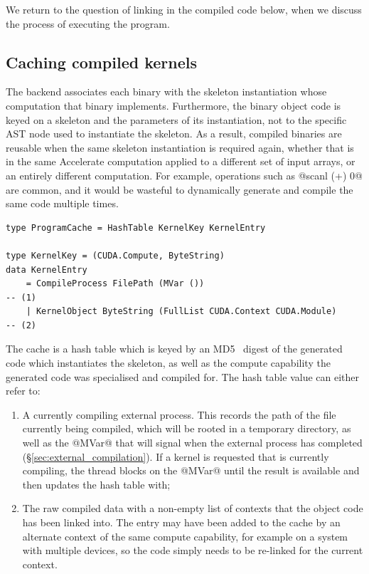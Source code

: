 We return to the question of linking in the compiled code below, when we discuss
the process of executing the program.


\subsection{Caching compiled kernels}
\label{sec:caching_compiled_kernels}

The \CUDA backend associates each \CUDA binary with the skeleton instantiation
whose computation that binary implements. Furthermore, the binary object code is
keyed on a skeleton and the parameters of its instantiation, not to the specific
AST node used to instantiate the skeleton. As a result, compiled binaries are
reusable when the same skeleton instantiation is required again, whether that is
in the same Accelerate computation applied to a different set of input arrays,
or an entirely different computation. For example, operations such as
@scanl (+) 0@ are common, and it would be wasteful to dynamically generate
and compile the same code multiple times.

\begin{lstlisting}[style=haskell,numbers=none]
type ProgramCache = HashTable KernelKey KernelEntry

type KernelKey = (CUDA.Compute, ByteString)
data KernelEntry
    = CompileProcess FilePath (MVar ())                                 -- (1)
    | KernelObject ByteString (FullList CUDA.Context CUDA.Module)       -- (2)
\end{lstlisting}

The cache is a hash table which is keyed by an MD5~\cite{Rivest:1992va} digest
of the generated \CUDA code which instantiates the skeleton, as well as the
compute capability the generated code was specialised and compiled for. The hash
table value can either refer to:
%
\begin{enumerate}
\item A currently compiling external process. This records the path of the file
    currently being compiled, which will be rooted in a temporary directory, as
    well as the @MVar@ that will signal when the external process has
    completed (\S\ref{sec:external_compilation}). If a kernel is requested that
    is currently compiling, the thread blocks on the @MVar@ until the
    result is available and then updates the hash table with;

\item The raw compiled data with a non-empty list of \CUDA contexts that the
    object code has been linked into. The entry may have been added to the cache
    by an alternate context of the same compute capability, for example on a
    system with multiple \CUDA devices, so the code simply needs to be
    re-linked for the current context.
\end{enumerate}

